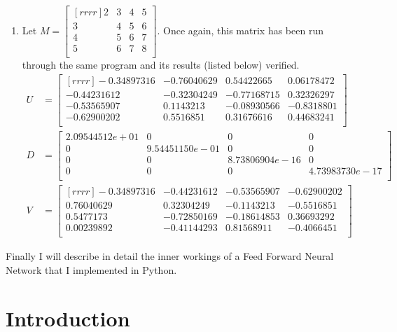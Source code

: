 \documentclass[12pt]{article}
\theoremstyle{definition}
\theoremstyle{plain}
\begin{document}
\begin{enumerate}
\begin{enumerate}
	\item Let $M=\begin{bmatrix}[rrrr]2&3&4&5\\3&4&5&6\\4&5&6&7\\5&6&7&8\\\end{bmatrix}$. Once again, this matrix has been run through the same program and its results (listed below) verified.
	\begin{align*}
	U&=\begin{bmatrix}[rrrr]
	-0.34897316 & -0.76040629 & 0.54422665 & 0.06178472\\
	-0.44231612 & -0.32304249 & -0.77168715 & 0.32326297\\
	-0.53565907 & 0.1143213 & -0.08930566 & -0.8318801\\
	-0.62900202 & 0.5516851 &  0.31676616 & 0.44683241\\\end{bmatrix}\\
	D&=\begin{bmatrix}
	2.09544512e+01 & 0 & 0 & 0\\
	0 & 9.54451150e-01 & 0 & 0\\
	0 & 0 & 8.73806904e-16 & 0\\
	0 & 0 & 0 & 4.73983730e-17\\\end{bmatrix}\\
	V&=\begin{bmatrix}[rrrr]
	-0.34897316 & -0.44231612 & -0.53565907 & -0.62900202\\
	0.76040629 & 0.32304249 & -0.1143213  & -0.5516851\\
	0.5477173 & -0.72850169 & -0.18614853 & 0.36693292\\
	0.00239892 & -0.41144293 & 0.81568911 & -0.4066451\\\end{bmatrix}
	\end{align*}
	\end{enumerate}

\end{enumerate}
Finally I will describe in detail the inner workings of a Feed Forward Neural Network that I implemented in Python.\\
\pagebreak
\section*{Introduction}
\end{document}
